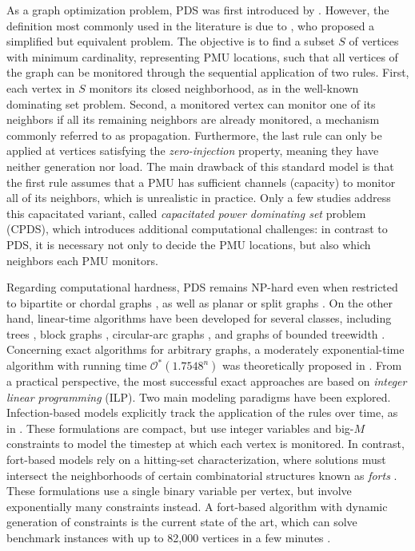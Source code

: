 \documentclass{article}
\begin{document}
As a graph optimization problem, PDS was first introduced by \citet{Haynes2002}.
However, the definition most commonly used in the literature is due to \citet{Brueni2005}, who proposed a simplified but equivalent problem.
The objective is to find a subset $S$ of vertices with minimum cardinality, representing PMU locations, such that all vertices of the graph can be monitored through the sequential application of two rules.
First, each vertex in $S$ monitors its closed neighborhood, as in the well-known dominating set problem.
Second, a monitored vertex can monitor one of its neighbors if all its remaining neighbors are already monitored, a mechanism commonly referred to as propagation.
Furthermore, the last rule can only be applied at vertices satisfying the \emph{zero-injection} property, meaning they have neither generation nor load.
The main drawback of this standard model is that the first rule assumes that a PMU has sufficient channels (capacity) to monitor all of its neighbors, which is unrealistic in practice.
Only a few studies address this capacitated variant, called \emph{capacitated power dominating set} problem (CPDS), which introduces additional computational challenges: in contrast to PDS, it is necessary not only to decide the PMU locations, but also which neighbors each PMU monitors.

Regarding computational hardness, PDS remains NP-hard even when restricted to bipartite or chordal graphs \citep{Haynes2002}, as well as planar or split graphs \citep{Guo2008}.
On the other hand, linear-time algorithms have been developed for several classes, including trees \citep{Haynes2002}, block graphs \citep{Xu2006}, circular-arc graphs \citep{Liao2013}, and graphs of bounded treewidth \citep{Guo2008}.
Concerning exact algorithms for arbitrary graphs, a moderately exponential-time algorithm with running time $\mathcal{O}^*(1.7548^n)$ was theoretically proposed in \citet{Binkele-Raible2012}.
From a practical perspective, the most successful exact approaches are based on \emph{integer linear programming} (ILP).
Two main modeling paradigms have been explored.
Infection-based models explicitly track the application of the rules over time, as in \citet{Brimkov2019, Jovanovic2020}.
These formulations are compact, but use integer variables and big-$M$ constraints to model the timestep at which each vertex is monitored.
In contrast, fort-based models rely on a hitting-set characterization, where solutions must intersect the neighborhoods of certain combinatorial structures known as \emph{forts} \citep{Bozeman2019}.
These formulations use a single binary variable per vertex, but involve exponentially many constraints instead.
A fort-based algorithm with dynamic generation of constraints is the current state of the art, which can solve benchmark instances with up to 82,000 vertices in a few minutes \citep{Blasius2024}.
\end{document}
